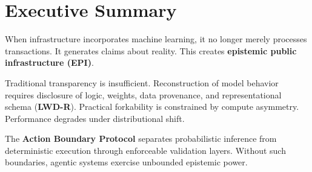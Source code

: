 \documentclass{article}
\theoremstyle{definition}
\begin{document}
\section*{Executive Summary}

When infrastructure incorporates machine learning, it no longer merely processes transactions. It generates claims about reality. This creates \textbf{epistemic public infrastructure (EPI)}.

Traditional transparency is insufficient. Reconstruction of model behavior requires disclosure of logic, weights, data provenance, and representational schema (\textbf{LWD-R}). Practical forkability is constrained by compute asymmetry. Performance degrades under distributional shift.

The \textbf{Action Boundary Protocol} separates probabilistic inference from deterministic execution through enforceable validation layers. Without such boundaries, agentic systems exercise unbounded epistemic power.
\end{document}
